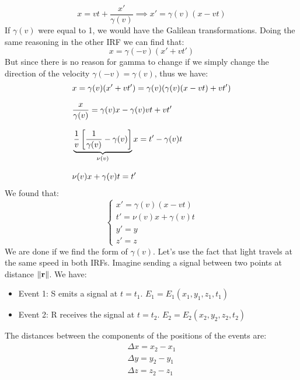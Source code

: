 \begin{equation}
  x = vt + \dfrac{x'}{\gamma(v)} \implies x' = \gamma(v)(x - vt)
\end{equation}
If $\gamma(v)$ were equal to 1, we would have the Galilean transformations. Doing the same reasoning in the other IRF we can find that:
\begin{equation}
 x = \gamma(-v)(x' + vt')
\end{equation}
But since there is no reason for gamma to change if we simply change the direction of the velocity $\gamma(-v) = \gamma(v)$, thus we have:
\begin{equation}
  \begin{split}
    &x = \gamma(v)(x' + vt') = \gamma(v)(\gamma(v)(x - vt) + vt') \\[8pt]
    &\dfrac{x}{\gamma(v)} = \gamma(v)x - \gamma(v)vt + vt' \\[8pt]
    &\underbrace{\dfrac{1}{v}\left[\dfrac{1}{\gamma(v)}- \gamma(v)\right]}_{\nu(v)}x = t' - \gamma(v)t \\[8pt]
    &\nu(v)x + \gamma(v)t = t'
  \end{split}
\end{equation}
We found that:
\begin{equation} \label{e:lt_start}
  \begin{cases}
    x' = \gamma(v)(x - vt) \\[8pt]
    t' = \nu(v)x + \gamma(v)t \\[8pt]
    y'=y \\[8pt]
    z'=z
  \end{cases}
\end{equation}
We are done if we find the form of $\gamma(v)$. Let's use the fact that light travels at the same speed in both IRFs. Imagine sending a signal between two points at distance $\norm{\vb{r}}$. We have:
\begin{itemize}
  \item Event 1: S emits a signal at $t=t_1$. $E_1 = E_1(x_1, y_1, z_1, t_1)$
  \item Event 2: R receives the signal at $t=t_2$. $E_2 = E_2(x_2, y_2, z_2, t_2)$
\end{itemize}
The distances between the components of the positions of the events are:
\begin{equation}
  \begin{split}
    \Delta x = x_2 - x_1 \\[8pt]
    \Delta y = y_2 - y_1 \\[8pt]
    \Delta z = z_2 - z_1
  \end{split}
\end{equation}
